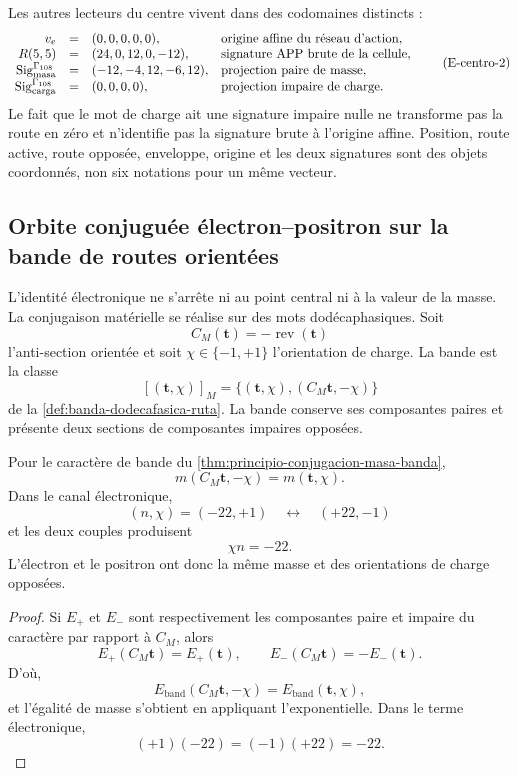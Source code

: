 Les autres lecteurs du centre vivent dans des codomaines distincts :
\[
\begin{array}{rcll}
 v_e&=&(0,0,0,0,0),
   &\text{origine affine du réseau d’action},\\
 R(5,5)&=&(24,0,12,0,-12),
   &\text{signature APP brute de la cellule},\\
 \operatorname{Sig}^{\Gamma_{108}}_{\rm masa}
   &=&(-12,-4,12,-6,12),
   &\text{projection paire de masse},\\
 \operatorname{Sig}^{\Gamma_{108}}_{\rm carga}
   &=&(0,0,0,0),
   &\text{projection impaire de charge}.
\end{array}
\tag{E-centro-2}\label{p12-83-c15-s2:eq:electron-firmas-tipadas-rev8}
\]
Le fait que le mot de charge ait une signature impaire nulle ne transforme pas la route en
zéro et n'identifie pas la signature brute à l'origine affine. Position, route
active, route opposée, enveloppe, origine et les deux signatures sont des objets
coordonnés, non six notations pour un même vecteur.

\subsection{Orbite conjuguée électron–positron sur la bande de routes orientées}

L'identité électronique ne s'arrête ni au point central ni à la valeur de la
masse. La conjugaison matérielle se réalise sur des mots dodécaphasiques. Soit
\[
 C_M(\mathbf t)=-\operatorname{rev}(\mathbf t)
\]
l'anti-section orientée et soit
\(\chi\in\{-1,+1\}\) l'orientation de charge. La bande est la classe
\[
 [(\mathbf t,\chi)]_M
 =
 \{(\mathbf t,\chi),(C_M\mathbf t,-\chi)\}
\]
de la \cref{def:banda-dodecafasica-ruta}. La bande conserve ses composantes
paires et présente deux sections de composantes impaires opposées.

\begin{theorem}
\label{p12-83-c15-s2:thm:electron-positron-biografia-rev6}
Pour le caractère de bande du
\cref{thm:principio-conjugacion-masa-banda},
\[
 m(C_M\mathbf t,-\chi)=m(\mathbf t,\chi).
\]
Dans le canal électronique,
\[
 (n,\chi)=(-22,+1)
 \quad\longleftrightarrow\quad
 (+22,-1)
\]
et les deux couples produisent
\[
 \chi n=-22.
\]
L'électron et le positron ont donc la même masse et des orientations de
charge opposées.
\end{theorem}

\begin{proof}
Si \(E_+\) et \(E_-\) sont respectivement les composantes paire et impaire du
caractère par rapport à \(C_M\), alors
\[
 E_+(C_M\mathbf t)=E_+(\mathbf t),
 \qquad
 E_-(C_M\mathbf t)=-E_-(\mathbf t).
\]
D'où,
\[
 E_{\mathrm{band}}(C_M\mathbf t,-\chi)
 =
 E_{\mathrm{band}}(\mathbf t,\chi),
\]
et l'égalité de masse s'obtient en appliquant l'exponentielle. Dans le terme
électronique,
\[
 (+1)(-22)=(-1)(+22)=-22.
\]
\end{proof}

